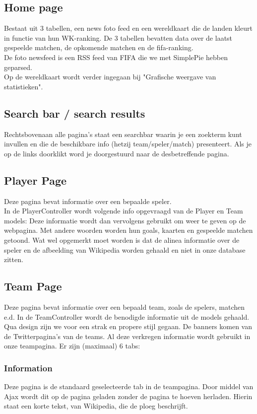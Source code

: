 \documentclass[11pt, a4paper]{article}
\begin{document}
\subsection{Home page}
Bestaat uit 3 tabellen, een news foto feed en een wereldkaart die de landen kleurt in functie van hun WK-ranking.
De 3 tabellen bevatten data over de laatst gespeelde matchen, de opkomende matchen en de fifa-ranking.
\\
De foto newsfeed is een RSS feed van FIFA die we met SimplePie hebben geparsed.
\\
Op de wereldkaart wordt verder ingegaan bij "Grafische weergave van statistieken".
\subsection{Search bar / search results}
Rechtsbovenaan alle pagina's staat een searchbar waarin je een zoekterm kunt invullen en die de beschikbare info (hetzij team/speler/match) presenteert. Als je op de links doorklikt word je doorgestuurd naar de desbetreffende pagina.

\subsection{Player Page}
Deze pagina bevat informatie over een bepaalde speler.
\\
In de PlayerController wordt volgende info opgevraagd van de Player en Team models:
Deze informatie wordt dan vervolgens gebruikt om weer te geven op de webpagina. Met andere woorden worden hun goals, kaarten en gespeelde matchen getoond. Wat wel opgemerkt moet worden is dat de alinea informatie over de speler en de afbeelding van Wikipedia worden gehaald en niet in onze database zitten.

\subsection{Team Page}
Deze pagina bevat informatie over een bepaald team, zoals de spelers, matchen e.d.
In de TeamController wordt de benodigde informatie uit de models gehaald.
Qua design zijn we voor een strak en propere stijl gegaan. De banners komen van de Twitterpagina's van de teams.
Al deze verkregen informatie wordt gebruikt in onze teampagina. Er zijn (maximaal) 6 tabs:
\subsubsection{Information}
Deze pagina is de standaard geselecteerde tab in de teampagina. Door middel van Ajax wordt dit op de pagina geladen zonder de pagina te hoeven herladen.
Hierin staat een korte tekst, van Wikipedia, die de ploeg beschrijft.
\end{document}

